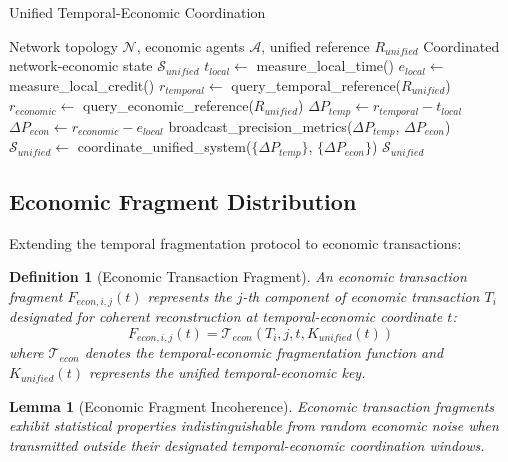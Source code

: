 \documentclass[12pt,a4paper]{article}
\newtheorem{lemma}[theorem]{Lemma}
\newtheorem{definition}[theorem]{Definition}
\begin{document}
\begin{algorithm}
\caption{Unified Temporal-Economic Coordination}
\begin{algorithmic}[1]
\Require Network topology $\mathcal{N}$, economic agents $\mathcal{A}$, unified reference $R_{unified}$
\Ensure Coordinated network-economic state $\mathcal{S}_{unified}$
    \State $t_{local} \leftarrow$ measure\_local\_time()
    \State $e_{local} \leftarrow$ measure\_local\_credit()
    \State $r_{temporal} \leftarrow$ query\_temporal\_reference($R_{unified}$)
    \State $r_{economic} \leftarrow$ query\_economic\_reference($R_{unified}$)
    \State $\Delta P_{temp} \leftarrow r_{temporal} - t_{local}$
    \State $\Delta P_{econ} \leftarrow r_{economic} - e_{local}$
    \State broadcast\_precision\_metrics($\Delta P_{temp}$, $\Delta P_{econ}$)
\EndFor
\State $\mathcal{S}_{unified} \leftarrow$ coordinate\_unified\_system($\{\Delta P_{temp}\}$, $\{\Delta P_{econ}\}$)
\State \Return $\mathcal{S}_{unified}$
\end{algorithmic}
\end{algorithm}

\subsection{Economic Fragment Distribution}

Extending the temporal fragmentation protocol to economic transactions:

\begin{definition}[Economic Transaction Fragment]
An economic transaction fragment $F_{econ,i,j}(t)$ represents the $j$-th component of economic transaction $T_i$ designated for coherent reconstruction at temporal-economic coordinate $t$:
\begin{equation}
F_{econ,i,j}(t) = \mathcal{T}_{econ}(T_i, j, t, K_{unified}(t))
\end{equation}
where $\mathcal{T}_{econ}$ denotes the temporal-economic fragmentation function and $K_{unified}(t)$ represents the unified temporal-economic key.
\end{definition}

\begin{lemma}[Economic Fragment Incoherence]
Economic transaction fragments exhibit statistical properties indistinguishable from random economic noise when transmitted outside their designated temporal-economic coordination windows.
\end{lemma}
\end{document}
